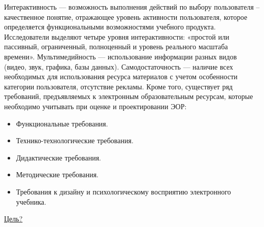 Интерактивность --- возможность выполнения действий по выбору пользователя – качественное понятие, отражающее уровень активности пользователя, которое определяется функциональными возможностями учебного продукта.
Исследователи выделяют четыре уровня интерактивности: «простой или пассивный, ограниченный, полноценный и уровень реального масштаба времени»\cite{kochisov15}.
Мультимедийность --- использование информации разных видов (видео, звук, графика, базы данных).
Самодостаточность --- наличие всех необходимых для использования ресурса материалов с учетом особенности категории пользователя, отсутствие рекламы.
Кроме того, существует ряд требований, предъявляемых к электронным образовательным ресурсам, которые необходимо учитывать при оценке и проектировании ЭОР:
\begin{itemize}
\item Функциональные требования\cite[c. 85]{larin}. 
\item Технико-технологические требования\cite[c. 87]{larin}. 
\item Дидактические требования\cite[c. 87]{larin}. 
\item Методические требования\cite[c. 89]{larin}. 
\item Требования к дизайну и психологическому восприятию электронного учебника\cite[c. 90]{larin}.
\end{itemize}
\hyperref[goal]{Цель?}

